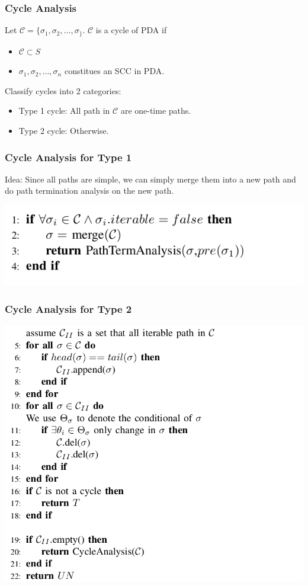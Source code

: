 \documentclass[11pt]{beamer}
\begin{document}
\begin{frame}\frametitle{Cycle Analysis}
\begin{definition}
Let $\mathcal{C}=\{\sigma_1, \sigma_2, \ldots, \sigma_\}$. $\mathcal{C}$ is a cycle of PDA  if
\begin{itemize}
\item $\mathcal{C} \subset S$
\item $\sigma_1, \sigma_2,\ldots, \sigma_n$ constitues an SCC in PDA.
\end{itemize}
\end{definition}
Classify cycles into 2 categories:
\begin{itemize}
\item Type 1 cycle:
All path in $\mathcal{C}$ are one-time paths. 
\item Type 2 cycle: Otherwise.
\end{itemize}
\end{frame}

\begin{frame}\frametitle{Cycle Analysis for Type 1}
Idea: Since all paths are simple, we can simply merge them into a new path and do path termination analysis on the new path.
\begin{center}
\includegraphics[scale=0.4]{type1cyclealgo.png}
\end{center}
\end{frame}
\begin{frame}\frametitle{Cycle Analysis for Type 2}
\begin{center}
\includegraphics[scale=0.3]{type2cyclealgo.png}
\end{center}
\end{frame}
\end{document}
